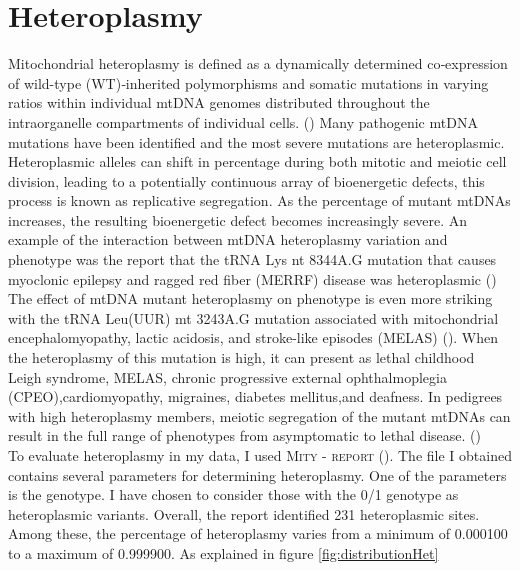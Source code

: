 \section{Heteroplasmy}


Mitochondrial heteroplasmy is defined as a dynamically determined co‐expression of wild-type (WT)‐inherited polymorphisms and somatic mutations in varying ratios within individual mtDNA genomes distributed throughout the intraorganelle compartments of individual cells. (\cite{stefano2016mitochondrial})
Many pathogenic mtDNA mutations have been identified and the most severe mutations are heteroplasmic.
Heteroplasmic alleles can shift in percentage during both mitotic and meiotic cell division, leading to a potentially continuous
array of bioenergetic defects, this process is known as replicative segregation. As the percentage of mutant mtDNAs increases, the resulting bioenergetic defect becomes increasingly severe. An example of the interaction between mtDNA heteroplasmy variation and phenotype was the report that the tRNA Lys nt 8344A.G  mutation that causes myoclonic epilepsy and ragged red fiber (MERRF) disease was heteroplasmic (\cite{wallace2013mitochondrial}) \\
The effect of mtDNA mutant heteroplasmy on phenotype is even more striking with the tRNA Leu(UUR) mt 3243A.G mutation associated with mitochondrial encephalomyopathy, lactic acidosis, and stroke-like episodes (MELAS) (\cite{goto2011dynamics}). When the heteroplasmy of this mutation is high, it can present as lethal childhood Leigh syndrome, MELAS, chronic progressive external ophthalmoplegia (CPEO),cardiomyopathy, migraines, diabetes mellitus,and deafness. In pedigrees with high heteroplasmy members, meiotic segregation of the mutant mtDNAs can result in the full range of phenotypes from asymptomatic to lethal disease.
(\cite{wallace2013mitochondrial})\\

To evaluate heteroplasmy in my data, I used \textsc{Mity - report} (\cite{puttick2019mity}). 
The file I obtained contains several parameters for determining heteroplasmy. One of the parameters is the genotype. I have chosen to consider those with the 0/1 genotype as heteroplasmic variants. Overall, the report identified 231 heteroplasmic sites. Among these, the percentage of heteroplasmy varies from a minimum of 0.000100  to a maximum of 0.999900.
As explained in figure \ref{fig:distributionHet} 

